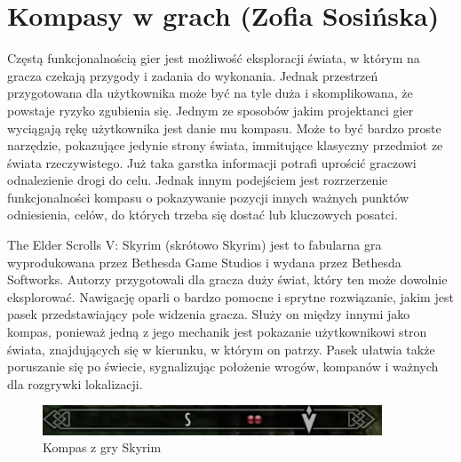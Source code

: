 \section{Kompasy w grach (Zofia Sosińska)}\label{chap:skrm}
Częstą funkcjonalnością gier jest możliwość eksploracji świata, w którym na gracza czekają przygody i zadania do wykonania.
Jednak przestrzeń przygotowana dla użytkownika może być na tyle duża i skomplikowana, że powstaje ryzyko 
zgubienia się. Jednym ze sposobów jakim projektanci gier wyciągają rękę użytkownika jest danie mu
kompasu. Może to być bardzo proste narzędzie, pokazujące jedynie strony świata, immitujące klasyczny przedmiot ze świata rzeczywistego.
Już taka garstka informacji potrafi uprościć graczowi odnalezienie drogi do celu. Jednak innym podejściem jest rozrzerzenie 
funkcjonalności kompasu o pokazywanie pozycji innych ważnych punktów odniesienia, celów, do których trzeba się dostać lub 
kluczowych posatci.

The Elder Scrolls V: Skyrim (skrótowo Skyrim) jest to fabularna gra
wyprodukowana przez Bethesda Game Studios i wydana przez Bethesda Softworks. Autorzy przygotowali dla gracza duży świat,
który ten może dowolnie eksplorować. Nawigację oparli o bardzo pomocne i sprytne rozwiązanie,
jakim jest pasek przedstawiający pole widzenia gracza. Służy on między innymi jako kompas, ponieważ 
jedną z jego mechanik jest pokazanie użytkownikowi stron świata, znajdujących się w kierunku, w którym 
on patrzy. Pasek ułatwia także poruszanie się po świecie, sygnalizując położenie wrogów, kompanów i ważnych 
dla rozgrywki lokalizacji.

\begin{figure}[htbp]
	\centering
	\includegraphics[width=0.9\textwidth]{images/ui/compassSkyrim.png}
	\caption{Kompas z gry Skyrim}\label{fig:Fallout}
\end{figure}

